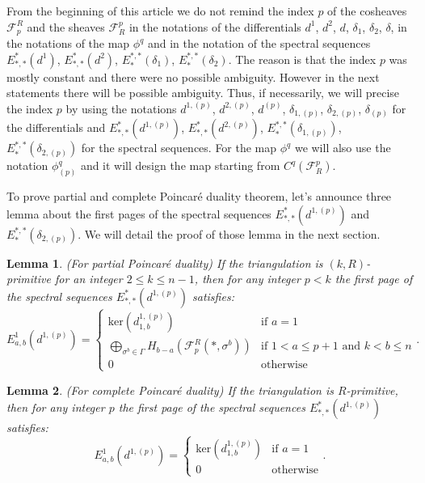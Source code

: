 \documentclass{article}
\newtheorem{lemma}{Lemma}
\begin{document}
From the beginning of this article we do not remind the index $p$ of the cosheaves $\mathcal{F}_{p}^R$ and the sheaves $\mathcal{F}^{p}_R$ in the notations of the differentials $d^{1}$, $d^{2}$, $d$, $\delta_{1}$, $\delta_{2}$, $\delta$, in the notations of the map $\phi^q$ and in the notation of the spectral sequences $E^*_{*,*}(d^{1})$, $E^*_{*,*}(d^{2})$, $E_*^{*,*}(\delta_{1})$, $E_*^{*,*}(\delta_{2})$. The reason is that the index $p$ was mostly constant and there were no possible ambiguity. However in the next statements there will be possible ambiguity. Thus, if necessarily, we will precise the index $p$ by using the notations $d^{1,(p)}$, $d^{2,(p)}$, $d^{(p)}$, $\delta_{1,(p)}$, $\delta_{2,(p)}$, $\delta_{(p)}$ for the differentials and $E^*_{*,*}(d^{1,(p)})$, $E^*_{*,*}(d^{2,(p)})$, $E_*^{*,*}(\delta_{1,(p)})$, $E_*^{*,*}(\delta_{2,(p)})$ for the spectral sequences. For the map $\phi^q$ we will also use the notation $\phi^q_{(p)}$ and it will design the map starting from $C^{q}(\mathcal{F}^{p}_R)$.

To prove partial and complete Poincaré duality theorem, let's announce three lemma about the first pages of the spectral sequences $E_{*,*}^*(d^{1,(p)})$ and $E^{*,*}_*(\delta_{2,(p)})$. We will detail the proof of those lemma in the next section.

\begin{lemma}
    (For partial Poincaré duality) If the triangulation is $(k,R)$-primitive for an integer $2\leq k \leq n-1$, then for any integer $p<k$ the first page of the spectral sequences $E_{*,*}^*(d^{1,(p)})$ satisfies:
    \begin{equation*}
        E^1_{a,b}(d^{1,(p)}) = \left \{ \begin{array}{ll}
            \mathrm{ker}(d^{1,(p)}_{1,b}) & \text{if } a=1 \\
            \bigoplus_{\sigma^b \in \Gamma}H_{b-a}(\mathcal{F}_p^R(*,\sigma^b)) & \text{if } 1<a\le p+1 \text{ and } k<b\leq n \\
            0 & \text{otherwise}
        \end{array} \right. .
    \end{equation*}
    \label{4}
\end{lemma}

\begin{lemma}
    (For complete Poincaré duality) If the triangulation is $R$-primitive, then for any integer $p$ the first page of the spectral sequences $E_{*,*}^*(d^{1,(p)})$ satisfies:
    \begin{equation*}
        E^1_{a,b}(d^{1,(p)}) = \left \{ \begin{array}{ll}
            \mathrm{ker}(d^{1,(p)}_{1,b}) & \text{if } a=1 \\
            0 & \text{otherwise}
        \end{array} \right. .
    \end{equation*}
    \label{4p}
\end{lemma}
\end{document}
